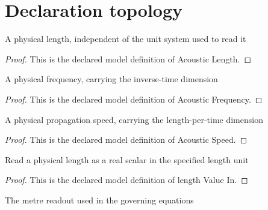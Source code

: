 \section{Declaration topology}
\begin{definition}
  \label{def:physics:phyx-mini-0118:phyxminiproblems-problemphyxmini0118-acousticlength}
  A physical length, independent of the unit system used to read it
\end{definition}
\begin{proof}
  This is the declared model definition of Acoustic Length.
\end{proof}
\begin{definition}
  \label{def:physics:phyx-mini-0118:phyxminiproblems-problemphyxmini0118-acousticfrequency}
  A physical frequency, carrying the inverse-time dimension
\end{definition}
\begin{proof}
  This is the declared model definition of Acoustic Frequency.
\end{proof}
\begin{definition}
  \label{def:physics:phyx-mini-0118:phyxminiproblems-problemphyxmini0118-acousticspeed}
  A physical propagation speed, carrying the length-per-time dimension
\end{definition}
\begin{proof}
  This is the declared model definition of Acoustic Speed.
\end{proof}
\begin{definition}
  \label{def:physics:phyx-mini-0118:phyxminiproblems-problemphyxmini0118-lengthvaluein}
  Read a physical length as a real scalar in the specified length unit
\end{definition}
\begin{proof}
  This is the declared model definition of length Value In.
\end{proof}
\begin{definition}
  \label{def:physics:phyx-mini-0118:phyxminiproblems-problemphyxmini0118-metersvalue}
  The metre readout used in the governing equations
\end{definition}
